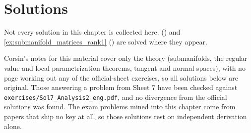 
\section{Solutions}
\label{sec:submanifolds_solutions}

Not every solution in this chapter is collected here. 
() and \cref{ex:submanifold_matrices_rank1}
() are solved where they appear.

\begin{ainote}
Corsin's notes for this material cover only the theory (submanifolds, the regular value and local
parametrization theorems, tangent and normal spaces), with no page working out any of the
official-sheet exercises, so all solutions below are original. Those answering a problem from
Sheet 7 have been checked against \texttt{exercises/Sol7\_Analysis2\_eng.pdf}, and no divergence
from the official solutions was found. The exam problems mined into this chapter come from papers
that ship no key at all, so those solutions rest on independent derivation alone.
\end{ainote}

